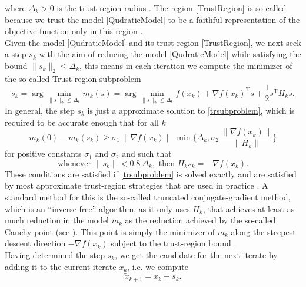 where $\Delta_k > 0$ is the trust-region radius \cite[p.~115]{ConnGouldToint:2000}. The region \cref{TrustRegion} is so called because we trust the model \cref{QudraticModel} to be a faithful representation of the objective function only in this region \cite[p.~2]{ConnGouldToint:2000}. \\
Given the model \cref{QudraticModel} and its trust-region \cref{TrustRegion}, we next seek a step $s_k$ with the aim of reducing the model \cref{QudraticModel} while satisfying the bound $\lVert s_k \rVert_2 \leq \Delta_k$, this means in each iteration we compute the minimizer of the so-called Trust-region subproblem
\begin{equation}\label{trsubproblem}
    s_k = \arg \min_{\lVert s \rVert_2 \leq \Delta_k} m_k(s) = \arg \min_{\lVert s \rVert_2 \leq \Delta_k} f(x_k) + \nabla f(x_k)^{\mathrm{T}} s + \frac{1}{2} s^{\mathrm{T}} H_k s.
\end{equation}
In general, the step $s_k$ is just a approximate solution to \cref{trsubproblem}, which is required to be accurate enough that for all $k$
\begin{equation}\label{accuracy1}
    m_k(0) - m_k(s_k) \geq \sigma_1 \ \lVert \nabla f(x_k) \rVert \ \min \{ \Delta_k, \sigma_2 \ \frac{\lVert \nabla f(x_k) \rVert}{\lVert H_k \rVert} \} 
\end{equation} 
for positive constants $\sigma_1$ and $\sigma_2$ and such that 
\begin{equation}\label{accuracy2}
    \text{whenever } \lVert s_k \rVert < 0.8 \ \Delta_k, \text{ then } H_k s_k = - \nabla f(x_k).
\end{equation}
These conditions are satisfied if \cref{trsubproblem} is solved exactly and are satisfied by most approximate trust-region strategies that are used in practice \cite[p.~1027]{ByrdKhalfanSchnabel:1996}. A standard method for this is the so-called truncated conjugate-gradient method, which is an “inverse-free” algorithm, as it only uses $H_k$, that achieves at least as much reduction in the model $m_k$ as the reduction achieved by the so-called Cauchy point (see \cite[4.1~Algorithms~based~on~the~cauchy~point]{NocedalWright:2006}). This point is simply the minimizer of $m_k$ along the steepest descent direction $- \nabla f(x_k)$ subject to the trust-region bound \cite[p.~71]{NocedalWright:2006}. \\
Having determined the step $s_k$, we get the candidate for the next iterate by adding it to the current iterate $x_k$, i.e. we compute 
\begin{equation}\label{candidate}
    \widetilde{x}_{k+1} = x_k + s_k.
\end{equation}
